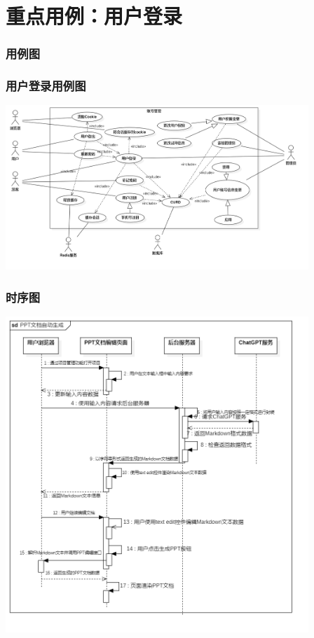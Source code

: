 \section{重点用例：用户登录}
\begin{frame}
    \frametitle{用例图}
    \frametitle{用户登录用例图}
    \center
    \includegraphics[width=4.5in]{contents/figure/login_usecase_diagram.png}
\end{frame}
\begin{frame}
    \frametitle{时序图}
    \center
    \includegraphics[width=4.5in]{contents/figure/ppt_generator_sequence_diagram.png}
\end{frame}
